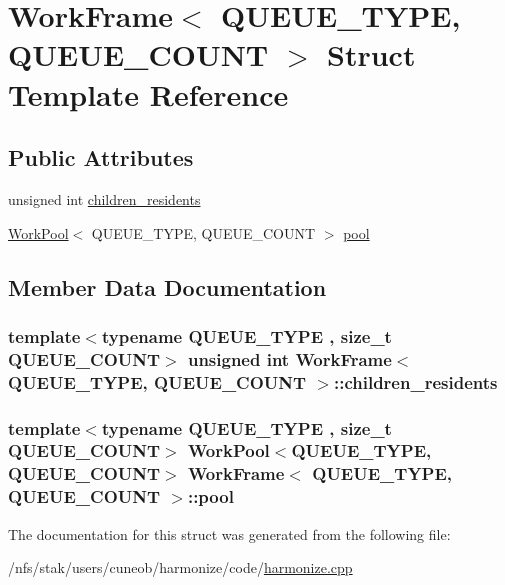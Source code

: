 \hypertarget{structWorkFrame}{\section{Work\-Frame$<$ Q\-U\-E\-U\-E\-\_\-\-T\-Y\-P\-E, Q\-U\-E\-U\-E\-\_\-\-C\-O\-U\-N\-T $>$ Struct Template Reference}
\label{structWorkFrame}
}
\subsection*{Public Attributes}
\begin{DoxyCompactItemize}
\item 
unsigned int \hyperlink{structWorkFrame_aadee4d423ec6f8e46368cad5e9a9ba4d}{children\-\_\-residents}
\item 
\hyperlink{structWorkPool}{Work\-Pool}$<$ Q\-U\-E\-U\-E\-\_\-\-T\-Y\-P\-E, Q\-U\-E\-U\-E\-\_\-\-C\-O\-U\-N\-T $>$ \hyperlink{structWorkFrame_a378c134104122b981b4e583914e76339}{pool}
\end{DoxyCompactItemize}


\subsection{Member Data Documentation}
\hypertarget{structWorkFrame_aadee4d423ec6f8e46368cad5e9a9ba4d}{
\subsubsection[{children\-\_\-residents}]{\setlength{\rightskip}{0pt plus 5cm}template$<$typename Q\-U\-E\-U\-E\-\_\-\-T\-Y\-P\-E , size\-\_\-t Q\-U\-E\-U\-E\-\_\-\-C\-O\-U\-N\-T$>$ unsigned int {\bf Work\-Frame}$<$ Q\-U\-E\-U\-E\-\_\-\-T\-Y\-P\-E, Q\-U\-E\-U\-E\-\_\-\-C\-O\-U\-N\-T $>$\-::children\-\_\-residents}}\label{structWorkFrame_aadee4d423ec6f8e46368cad5e9a9ba4d}
\hypertarget{structWorkFrame_a378c134104122b981b4e583914e76339}{
\subsubsection[{pool}]{\setlength{\rightskip}{0pt plus 5cm}template$<$typename Q\-U\-E\-U\-E\-\_\-\-T\-Y\-P\-E , size\-\_\-t Q\-U\-E\-U\-E\-\_\-\-C\-O\-U\-N\-T$>$ {\bf Work\-Pool}$<$Q\-U\-E\-U\-E\-\_\-\-T\-Y\-P\-E, Q\-U\-E\-U\-E\-\_\-\-C\-O\-U\-N\-T$>$ {\bf Work\-Frame}$<$ Q\-U\-E\-U\-E\-\_\-\-T\-Y\-P\-E, Q\-U\-E\-U\-E\-\_\-\-C\-O\-U\-N\-T $>$\-::pool}}\label{structWorkFrame_a378c134104122b981b4e583914e76339}


The documentation for this struct was generated from the following file\-:\begin{DoxyCompactItemize}
\item 
/nfs/stak/users/cuneob/harmonize/code/\hyperlink{harmonize_8cpp}{harmonize.\-cpp}\end{DoxyCompactItemize}
